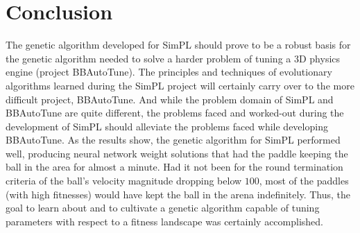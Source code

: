 \documentclass[a4paper,10pt]{article}
\begin{document}





\section{Conclusion}

The genetic algorithm developed for SimPL should prove to be a robust basis for the genetic algorithm needed to solve a harder problem of tuning a 3D physics engine (project BBAutoTune). The principles and techniques of evolutionary algorithms learned during the SimPL project will certainly carry over to the more difficult project, BBAutoTune. And while the problem domain of SimPL and BBAutoTune are quite different, the problems faced and worked-out during the development of SimPL should alleviate the problems faced while developing BBAutoTune. As the results show, the genetic algorithm for SimPL performed well, producing neural network weight solutions that had the paddle keeping the ball in the area for almost a minute. Had it not been for the round termination criteria of the ball's velocity magnitude dropping below $100$, most of the paddles (with high fitnesses) would have kept the ball in the arena indefinitely. Thus, the goal to learn about and to cultivate a genetic algorithm capable of tuning parameters with respect to a fitness landscape was certainly accomplished.     



\end{document}
